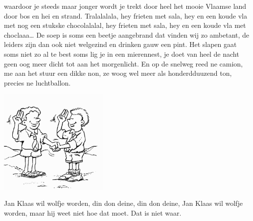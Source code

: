 \documentclass{article}
\begin{document}
\begin{songs}{}
waardoor je steeds maar jonger wordt
je trekt door heel het mooie Vlaamse land
door bos en hei en strand.
\endverse
\beginchorus
Tralalalala, hey frieten met sala, hey
en een koude vla met nog een stukske
chocolalalal, hey frieten met sala, hey
en een koude vla met choclaaa…
\endchorus
\beginverse
De soep is soms een beetje aangebrand
dat vinden wij zo ambetant, 
de leiders zijn dan ook niet welgezind
en drinken gauw een pint.
\endverse
\beginverse
Het slapen gaat soms niet zo al te best
soms lig je in een mierennest,
je doet van heel de nacht geen oog meer dicht
tot aan het morgenlicht.
\endverse
\beginverse
En op de snelweg reed ne camion,
me aan het stuur een dikke non,
ze woog wel meer als honderdduuzend ton,
precies ne luchtballon.
\endverse
\endsong
\begin{intersong}
    \includegraphics[width=0.4\textwidth]{janklaas}
\end{intersong}
\beginverse
Jan Klaas wil wolfje worden,
din don deine, din don deine,
Jan Klaas wil wolfje worden,
maar hij weet niet hoe dat moet.
\endverse
\beginchorus
Dat is niet waar.


\end{songs}
\end{document}
